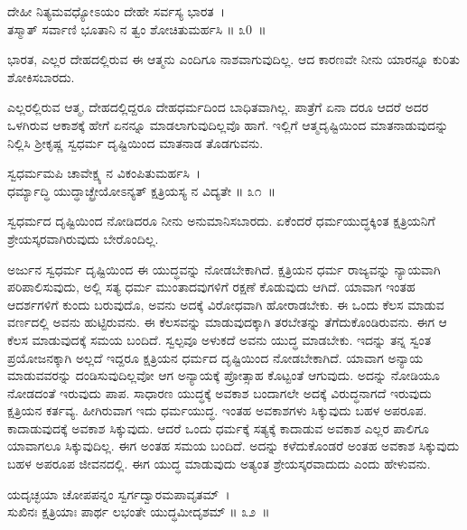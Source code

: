 \begin{shloka}
ದೇಹೀ ನಿತ್ಯಮವಧ್ಯೋಽಯಂ ದೇಹೇ ಸರ್ವಸ್ಯ ಭಾರತ~।\\ತಸ್ಮಾತ್ ಸರ್ವಾಣಿ ಭೂತಾನಿ ನ ತ್ವಂ ಶೋಚಿತುಮರ್ಹಸಿ \hfill॥ ೩0~॥
\end{shloka}

\begin{artha}
ಭಾರತ, ಎಲ್ಲರ ದೇಹದಲ್ಲಿರುವ ಈ ಆತ್ಮನು ಎಂದಿಗೂ ನಾಶವಾಗುವುದಿಲ್ಲ. ಆದ ಕಾರಣವೇ ನೀನು ಯಾರನ್ನೂ ಕುರಿತು ಶೋಕಿಸಬಾರದು.
\end{artha}

ಎಲ್ಲರಲ್ಲಿರುವ ಆತ್ಮ, ದೇಹದಲ್ಲಿದ್ದರೂ ದೇಹಧರ್ಮದಿಂದ ಬಾಧಿತವಾಗಿಲ್ಲ. ಪಾತ್ರೆಗೆ ಏನಾ ದರೂ ಆದರೆ ಅದರ ಒಳಗಿರುವ ಆಕಾಶಕ್ಕೆ ಹೇಗೆ ಏನನ್ನೂ ಮಾಡಲಾಗುವುದಿಲ್ಲವೊ ಹಾಗೆ. ಇಲ್ಲಿಗೆ ಆತ್ಮದೃಷ್ಟಿಯಿಂದ ಮಾತನಾಡುವುದನ್ನು ನಿಲ್ಲಿಸಿ ಶ‍್ರೀಕೃಷ್ಣ ಸ್ವಧರ್ಮ ದೃಷ್ಟಿಯಿಂದ ಮಾತನಾಡ ತೊಡಗುವನು.

\begin{shloka}
ಸ್ವಧರ್ಮಮಪಿ ಚಾವೇಕ್ಷ್ಯ ನ ವಿಕಂಪಿತುಮರ್ಹಸಿ~।\\ಧರ್ಮ್ಯಾದ್ಧಿ ಯುದ್ಧಾಚ್ಛ್ರೇಯೋಽನ್ಯತ್ ಕ್ಷತ್ರಿಯಸ್ಯ ನ ವಿದ್ಯತೇ \hfill॥ ೩೧~॥
\end{shloka}

\begin{artha}
ಸ್ವಧರ್ಮದ ದೃಷ್ಟಿಯಿಂದ ನೋಡಿದರೂ ನೀನು ಅನುಮಾನಿಸಬಾರದು. ಏಕೆಂದರೆ ಧರ್ಮ\-ಯುದ್ಧಕ್ಕಿಂತ ಕ್ಷತ್ರಿಯನಿಗೆ ಶ್ರೇಯಸ್ಕರವಾಗಿರುವುದು ಬೇರೊಂದಿಲ್ಲ.
\end{artha}

ಅರ್ಜುನ ಸ್ವಧರ್ಮ ದೃಷ್ಟಿಯಿಂದ ಈ ಯುದ್ಧವನ್ನು ನೋಡಬೇಕಾಗಿದೆ. ಕ್ಷತ್ರಿಯನ ಧರ್ಮ ರಾಜ್ಯವನ್ನು ನ್ಯಾಯವಾಗಿ ಪರಿಪಾಲಿಸುವುದು, ಅಲ್ಲಿ ಸತ್ಯ ಧರ್ಮ ಮುಂತಾದವುಗಳಿಗೆ ರಕ್ಷಣೆ ಕೊಡುವುದು ಆಗಿದೆ. ಯಾವಾಗ ಇಂತಹ ಆದರ್ಶಗಳಿಗೆ ಕುಂದು ಬರುವುದೊ, ಅವನು ಅದಕ್ಕೆ ವಿರೋಧವಾಗಿ ಹೋರಾಡಬೇಕು. ಈ ಒಂದು ಕೆಲಸ ಮಾಡುವ ವರ್ಣದಲ್ಲಿ ಅವನು ಹುಟ್ಟಿರುವನು. ಈ ಕೆಲಸವನ್ನು ಮಾಡುವುದಕ್ಕಾಗಿ ತರಬೇತನ್ನು ತೆಗೆದುಕೊಂಡಿರುವನು. ಈಗ ಆ ಕೆಲಸ ಮಾಡುವುದಕ್ಕೆ ಸಮಯ ಬಂದಿದೆ. ಸ್ವಲ್ಪವೂ ಅಳುಕದೆ ಅವನು ಯುದ್ಧ ಮಾಡಬೇಕು. ಇದನ್ನು ತನ್ನ ಸ್ವಂತ ಪ್ರಯೋಜನಕ್ಕಾಗಿ ಅಲ್ಲದೆ ಇದ್ದರೂ ಕ್ಷತ್ರಿಯನ ಧರ್ಮದ ದೃಷ್ಟಿಯಿಂದ ನೋಡಬೇಕಾಗಿದೆ. ಯಾವಾಗ ಅನ್ಯಾಯ ಮಾಡುವವರನ್ನು ದಂಡಿಸುವುದಿಲ್ಲವೋ ಆಗ ಅನ್ಯಾಯಕ್ಕೆ ಪ್ರೋತ್ಸಾಹ ಕೊಟ್ಟಂತೆ ಆಗುವುದು. ಅದನ್ನು ನೋಡಿಯೂ ನೋಡದಂತೆ ಇರುವುದು ಪಾಪ. ಸಾಧಾರಣ ಯುದ್ಧಕ್ಕೆ ಅವಕಾಶ ಬಂದಾಗಲೇ ಅದಕ್ಕೆ ವಿರುದ್ಧನಾಗದೆ ಇರುವುದು ಕ್ಷತ್ರಿಯನ ಕರ್ತವ್ಯ. ಹೀಗಿರುವಾಗ ಇದು ಧರ್ಮಯುದ್ಧ. ಇಂತಹ ಅವಕಾಶಗಳು ಸಿಕ್ಕುವುದು ಬಹಳ ಅಪರೂಪ. ಕಾದಾಡುವುದಕ್ಕೆ ಅವಕಾಶ ಸಿಕ್ಕುವುದು. ಆದರೆ ಒಂದು ಧರ್ಮಕ್ಕೆ ಸತ್ಯಕ್ಕೆ ಕಾದಾಡುವ ಅವಕಾಶ ಎಲ್ಲರ ಪಾಲಿಗೂ ಯಾವಾಗಲೂ ಸಿಕ್ಕುವುದಿಲ್ಲ. ಈಗ ಅಂತಹ ಸಮಯ ಬಂದಿದೆ. ಅದನ್ನು ಕಳೆದುಕೊಂಡರೆ ಅಂತಹ ಅವಕಾಶ ಸಿಕ್ಕುವುದು ಬಹಳ ಅಪರೂಪ ಜೀವನದಲ್ಲಿ. ಈಗ ಯುದ್ಧ ಮಾಡುವುದು ಅತ್ಯಂತ ಶ್ರೇಯಸ್ಕರವಾದುದು ಎಂದು ಹೇಳುವನು.

\begin{shloka}
ಯದೃಚ್ಛಯಾ ಚೋಪಪನ್ನಂ ಸ್ವರ್ಗದ್ವಾರಮಪಾವೃತಮ್~।\\ಸುಖಿನಃ ಕ್ಷತ್ರಿಯಾಃ ಪಾರ್ಥ ಲಭಂತೇ ಯುದ್ಧಮೀದೃಶಮ್ \hfill॥ ೩೨~॥
\end{shloka}

